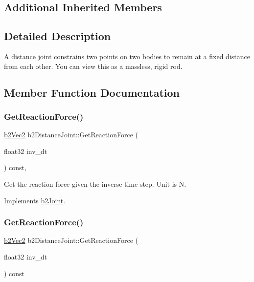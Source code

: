 \subsection*{Additional Inherited Members}


\subsection{Detailed Description}
A distance joint constrains two points on two bodies to remain at a fixed distance from each other. You can view this as a massless, rigid rod. 

\subsection{Member Function Documentation}
\mbox{\label{classb2DistanceJoint_a6aa951e5bbfcae8a617987955cadbed5}} 
\subsubsection{\texorpdfstring{Get\+Reaction\+Force()}{GetReactionForce()}\hspace{0.1cm}{\footnotesize\ttfamily [1/2]}}
{\footnotesize\ttfamily \hyperlink{structb2Vec2}{b2\+Vec2} b2\+Distance\+Joint\+::\+Get\+Reaction\+Force (\begin{DoxyParamCaption}\item[{float32}]{inv\+\_\+dt }\end{DoxyParamCaption}) const\hspace{0.3cm}{\ttfamily [override]}, {\ttfamily [virtual]}}

Get the reaction force given the inverse time step. Unit is N. 

Implements \hyperlink{classb2Joint_a7e0eddefb9b69ad050b8ef6425838a74}{b2\+Joint}.

\mbox{\label{classb2DistanceJoint_ae396ea13a9df2c47a267151c67b3d4fe}} 
\subsubsection{\texorpdfstring{Get\+Reaction\+Force()}{GetReactionForce()}\hspace{0.1cm}{\footnotesize\ttfamily [2/2]}}
{\footnotesize\ttfamily \hyperlink{structb2Vec2}{b2\+Vec2} b2\+Distance\+Joint\+::\+Get\+Reaction\+Force (\begin{DoxyParamCaption}\item[{float32}]{inv\+\_\+dt }\end{DoxyParamCaption}) const\hspace{0.3cm}{\ttfamily [virtual]}}

